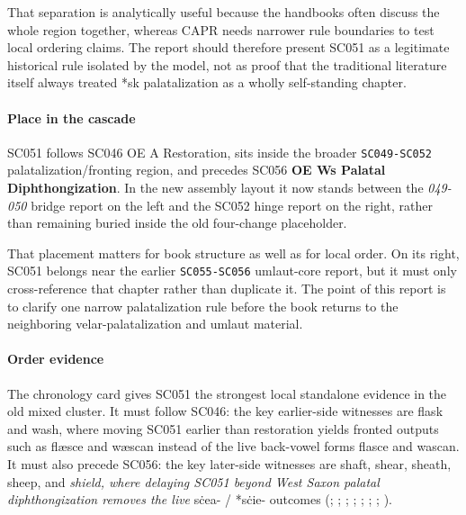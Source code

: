 \documentclass[
  british,
  a4paper,
]{article}
\begin{document}
That separation is analytically useful because the handbooks often
discuss the whole region together, whereas CAPR needs narrower rule
boundaries to test local ordering claims. The report should therefore
present SC051 as a legitimate historical rule isolated by the model, not
as proof that the traditional literature itself always treated *sk
palatalization as a wholly self-standing chapter.

\paragraph{Place in the cascade}\label{place-in-the-cascade-31}

SC051 follows SC046 OE A Restoration, sits inside the broader
\texttt{SC049-SC052} palatalization/fronting region, and precedes SC056
\textbf{OE Ws Palatal Diphthongization}. In the new assembly layout it
now stands between the \emph{049-050} bridge report on the left and the
SC052 hinge report on the right, rather than remaining buried inside the
old four-change placeholder.

That placement matters for book structure as well as for local order. On
its right, SC051 belongs near the earlier \texttt{SC055-SC056}
umlaut-core report, but it must only cross-reference that chapter rather
than duplicate it. The point of this report is to clarify one narrow
palatalization rule before the book returns to the neighboring
velar-palatalization and umlaut material.

\paragraph{Order evidence}\label{order-evidence-31}

The chronology card gives SC051 the strongest local standalone evidence
in the old mixed cluster. It must follow SC046: the key earlier-side
witnesses are flask and wash, where moving SC051 earlier than
restoration yields fronted outputs such as flæsce and wæscan instead of
the live back-vowel forms flasce and wascan. It must also precede SC056:
the key later-side witnesses are shaft, shear, sheath, sheep, and
\emph{shield, where delaying SC051 beyond West Saxon palatal
diphthongization removes the live }sċea- / *sċie- outcomes
(;
;
;
;
;
;
; ).
\end{document}
